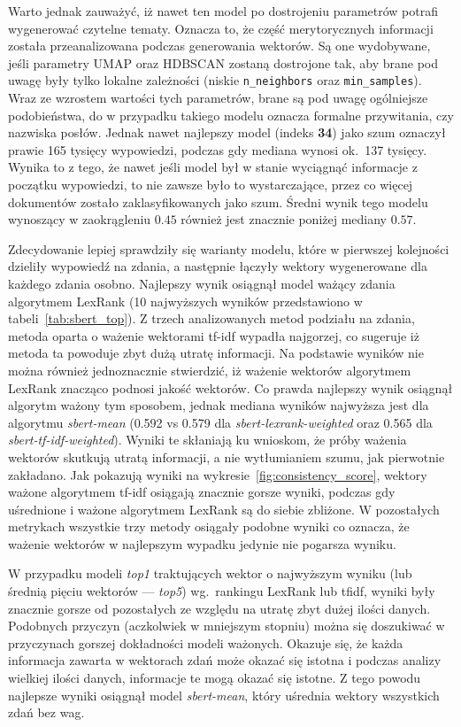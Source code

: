 		Warto jednak zauważyć, iż nawet ten model po dostrojeniu parametrów potrafi wygenerować czytelne tematy.
		Oznacza to, że część merytorycznych informacji została przeanalizowana podczas generowania wektorów.
		Są one wydobywane, jeśli parametry UMAP oraz HDBSCAN zostaną dostrojone tak,
			aby brane pod uwagę były tylko lokalne zależności (niskie \verb|n_neighbors| oraz \verb|min_samples|).
		Wraz ze wzrostem wartości tych parametrów, brane są pod uwagę ogólniejsze podobieństwa,
			do w przypadku takiego modelu oznacza formalne przywitania, czy nazwiska posłów.
		Jednak nawet najlepszy model (indeks \textbf{34}) jako szum oznaczył prawie 165 tysięcy wypowiedzi, podczas gdy mediana wynosi ok.~137 tysięcy.
		Wynika to z tego, że nawet jeśli model był w stanie wyciągnąć informacje z początku wypowiedzi, to nie zawsze było to wystarczające, przez co więcej dokumentów zostało zaklasyfikowanych jako szum.
		Średni wynik tego modelu wynoszący w zaokrągleniu \(0.45\) również jest znacznie poniżej mediany \(0.57\).

		Zdecydowanie lepiej sprawdziły się warianty modelu, które w pierwszej kolejności dzieliły wypowiedź na zdania, a następnie łączyły wektory wygenerowane dla każdego zdania osobno.
		Najlepszy wynik osiągnął model ważący zdania algorytmem LexRank (10 najwyższych wyników przedstawiono w tabeli~\ref{tab:sbert_top}).
		Z trzech analizowanych metod podziału na zdania, metoda oparta o ważenie wektorami tf-idf wypadła najgorzej, co sugeruje iż metoda ta powoduje zbyt dużą utratę informacji.
		Na podstawie wyników nie można również jednoznacznie stwierdzić, iż ważenie wektorów algorytmem LexRank znacząco podnosi jakość wektorów.
		Co prawda najlepszy wynik osiągnął algorytm ważony tym sposobem,
			jednak mediana wyników najwyższa jest dla algorytmu \emph{sbert-mean} (0.592 vs 0.579 dla \emph{sbert-lexrank-weighted} oraz 0.565 dla \emph{sbert-tf-idf-weighted}).
		Wyniki te skłaniają ku wnioskom, że próby ważenia wektorów skutkują utratą informacji, a nie wytłumianiem szumu, jak pierwotnie zakładano.
		Jak pokazują wyniki na wykresie~\ref{fig:consistency_score}, wektory ważone algorytmem tf-idf osiągają znacznie gorsze wyniki,
			podczas gdy uśrednione i ważone algorytmem LexRank są do siebie zbliżone.
		W pozostałych metrykach wszystkie trzy metody osiągały podobne wyniki co oznacza, że ważenie wektorów w najlepszym wypadku jedynie nie pogarsza wyniku.
		
		W przypadku modeli \emph{top1} traktujących wektor o najwyższym wyniku (lub średnią pięciu wektorów --- \emph{top5}) wg.\ rankingu LexRank lub tfidf,
			wyniki były znacznie gorsze od pozostałych ze względu na utratę zbyt dużej ilości danych.
		Podobnych przyczyn (aczkolwiek w mniejszym stopniu) można się doszukiwać w przyczynach gorszej dokładności modeli ważonych.
		Okazuje się, że każda informacja zawarta w wektorach zdań może okazać się istotna i podczas analizy wielkiej ilości danych,
			informacje te mogą okazać się istotne.
		Z tego powodu najlepsze wyniki osiągnął model \emph{sbert-mean}, który uśrednia wektory wszystkich zdań bez wag.

